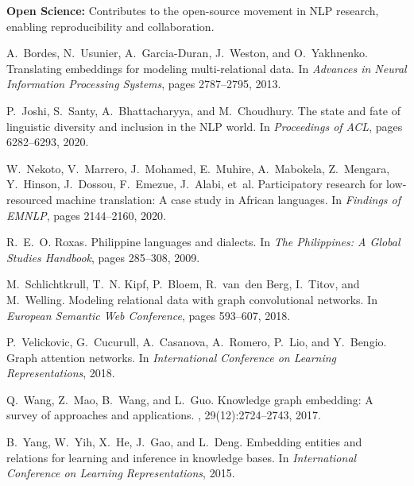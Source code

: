 \documentclass[11pt]{article}
\begin{document}
\textbf{Open Science:} Contributes to the open-source movement in NLP research, enabling reproducibility and collaboration.


\begin{thebibliography}{10}

A.~Bordes, N.~Usunier, A.~Garcia-Duran, J.~Weston, and O.~Yakhnenko.
\newblock Translating embeddings for modeling multi-relational data.
\newblock In {\em Advances in Neural Information Processing Systems}, pages 2787--2795, 2013.

P.~Joshi, S.~Santy, A.~Bhattacharyya, and M.~Choudhury.
\newblock The state and fate of linguistic diversity and inclusion in the NLP world.
\newblock In {\em Proceedings of ACL}, pages 6282--6293, 2020.

W.~Nekoto, V.~Marrero, J.~Mohamed, E.~Muhire, A.~Mabokela, Z.~Mengara, Y.~Hinson, J.~Dossou, F.~Emezue, J.~Alabi, et~al.
\newblock Participatory research for low-resourced machine translation: A case study in African languages.
\newblock In {\em Findings of EMNLP}, pages 2144--2160, 2020.

R.~E.~O. Roxas.
\newblock Philippine languages and dialects.
\newblock In {\em The Philippines: A Global Studies Handbook}, pages 285--308, 2009.

M.~Schlichtkrull, T.~N. Kipf, P.~Bloem, R.~van~den Berg, I.~Titov, and M.~Welling.
\newblock Modeling relational data with graph convolutional networks.
\newblock In {\em European Semantic Web Conference}, pages 593--607, 2018.

P.~Velickovic, G.~Cucurull, A.~Casanova, A.~Romero, P.~Lio, and Y.~Bengio.
\newblock Graph attention networks.
\newblock In {\em International Conference on Learning Representations}, 2018.

Q.~Wang, Z.~Mao, B.~Wang, and L.~Guo.
\newblock Knowledge graph embedding: A survey of approaches and applications.
, 29(12):2724--2743, 2017.

B.~Yang, W.~Yih, X.~He, J.~Gao, and L.~Deng.
\newblock Embedding entities and relations for learning and inference in knowledge bases.
\newblock In {\em International Conference on Learning Representations}, 2015.

\end{thebibliography}
\end{document}
